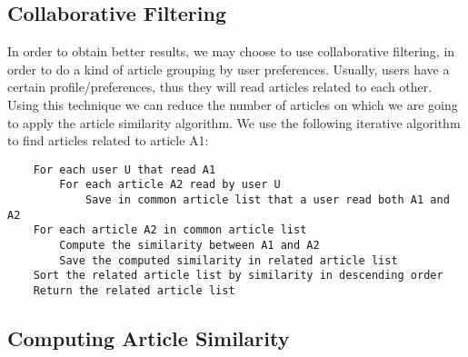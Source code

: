 \subsection{Collaborative Filtering}
\label{sec:collaborative-filtering}
In order to obtain better results, we may choose to use collaborative filtering, in order to do a kind of article grouping by user preferences. Usually, users have a certain profile/preferences, thus they will read articles related to each other. Using this technique we can reduce the number of articles on which we are going to apply the article similarity algorithm. We use the following iterative algorithm to find articles related to article A1:
\lstset{language=make,caption=Item to item collaborative filtering,label=lst:app-make}
\begin{lstlisting}
	For each user U that read A1
		For each article A2 read by user U
			Save in common article list that a user read both A1 and A2
	For each article A2 in common article list
		Compute the similarity between A1 and A2
		Save the computed similarity in related article list
	Sort the related article list by similarity in descending order
	Return the related article list
\end{lstlisting}

\subsection{Computing Article Similarity}
\label{sec:computing-article-similarity}

